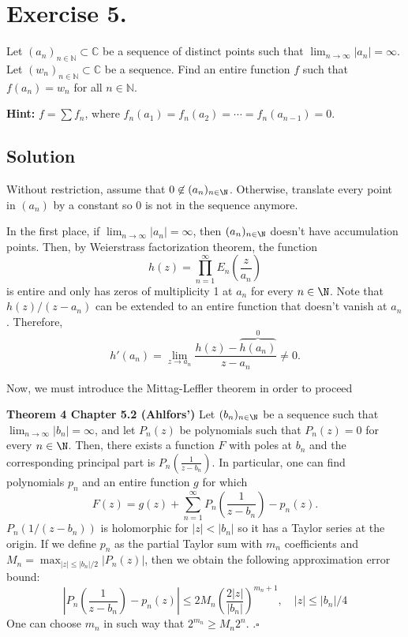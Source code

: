 
\section{Exercise 5.}

Let \( (a_n)_{n \in \mathbb{N}} \subset \mathbb{C} \) be a sequence of distinct points such that \( \lim_{n \to \infty} |a_n| = \infty \). Let \( (w_n)_{n \in \mathbb{N}} \subset \mathbb{C} \) be a sequence. Find an entire function \( f \) such that \( f(a_n) = w_n \) for all \( n \in \mathbb{N} \).  

\textbf{Hint:} \( f = \sum f_n \), where \( f_n(a_1) = f_n(a_2) = \cdots = f_n(a_{n-1}) = 0 \).


\subsection*{Solution}

Without restriction, assume that $0 \not \in (a_n)_{n\in\N}$. Otherwise, translate every point in $(a_n)$ by a constant so $0$ is not in the sequence anymore.

In the first place, if $\lim_{n \to \infty} |a_n| = \infty$, then $(a_n)_{n\in \N}$ doesn't have accumulation points. Then, by Weierstrass factorization theorem, the function
\[ h(z) = \prod_{n = 1}^{\infty} E_n\left( \frac{z}{a_n} \right) \]
is entire and only has zeros of multiplicity 1 at $a_n$ for every $n\in \N$. Note that $h(z)/(z-a_n)$ can be extended to an entire function that doesn't vanish at $a_n$. Therefore,
\[ h'(a_n) = \lim_{z\to a_n} \frac{h(z) - \overbrace{h(a_n)}^{0}}{z-a_n} \neq 0. \]

Now, we must introduce the Mittag-Leffler theorem in order to proceed

\textbf{Theorem 4 Chapter 5.2 (Ahlfors')} Let $(b_n)_{n\in\N}$ be a sequence such that $\lim_{n\to\infty} |b_n| = \infty$, and let $P_n(z)$ be polynomials such that $P_n(z) = 0$ for every $n \in \N$. Then, there exists a function $F$ with poles at $b_n$ and the corresponding principal part is $P_n\left( \frac{1}{z-b_n} \right)$. In particular, one can find polynomials $p_n$ and an entire function $g$ for which
\[ F(z) = g(z) + \sum_{n = 1}^{\infty} P_n\left( \frac{1}{z-b_n} \right) - p_n(z). \]
$P_n(1/(z-b_n))$ is holomorphic for $|z| < |b_n|$ so it has a Taylor series at the origin. If we define $p_n$ as the partial Taylor sum with $m_n$ coefficients and $M_n = \max_{|z|\leq |b_n|/2}|P_n(z)|$, then we obtain the following approximation error bound:
\[ \left| P_n\left( \frac{1}{z-b_n} \right) - p_n(z) \right| \leq 2M_n \left( \frac{2|z|}{|b_n|} \right)^{m_n+1},\quad |z| \leq |b_n|/4\]
One can choose $m_n$ in such way that $2^{m_n} \geq M_n 2^n$.
.\hfill $\square$

